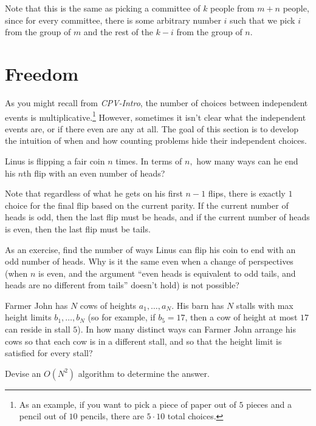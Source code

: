 \begin{pro}
Note that this is the same as picking a committee of $k$ people from $m+n$ people, since for every committee, there is some arbitrary number $i$ such that we pick $i$ from the group of $m$ and the rest of the $k-i$ from the group of $n.$
\end{pro}

\section{Freedom}

As you might recall from \emph{CPV-Intro}, the number of choices between independent events is multiplicative.\footnote{As an example, if you want to pick a piece of paper out of $5$ pieces and a pencil out of $10$ pencils, there are $5\cdot 10$ total choices.} However, sometimes it isn't clear what the independent events are, or if there even are any at all. The goal of this section is to develop the intuition of when and how counting problems hide their independent choices.

\begin{exam}[Coins]
Linus is flipping a fair coin $n$ times. In terms of $n,$ how many ways can he end his $n$th flip with an even number of heads?
\end{exam}

\begin{sol}
Note that regardless of what he gets on his first $n-1$ flips, there is exactly $1$ choice for the final flip based on the current parity. If the current number of heads is odd, then the last flip must be heads, and if the current number of heads is even, then the last flip must be tails.
\end{sol}

As an exercise, find the number of ways Linus can flip his coin to end with an odd number of heads. Why is it the same even when a change of perspectives (when $n$ is even, and the argument ``even heads is equivalent to odd tails, and heads are no different from tails'' doesn't hold) is not possible?

\begin{exam}
Farmer John has $N$ cows of heights $a_1,\ldots,a_N.$ His barn has $N$ stalls with max height limits $b_1,\ldots,b_N$ (so for example, if $b_5=17$, then a cow of height at most $17$ can reside in stall $5$). In how many distinct ways can Farmer John arrange his cows so that each cow is in a different stall, and so that the height limit is satisfied for every stall? 

Devise an $O(N^2)$ algorithm to determine the answer.
\end{exam}

